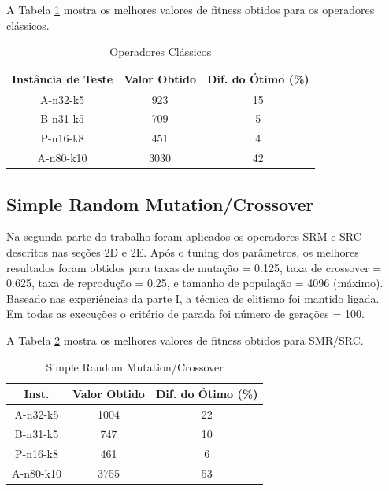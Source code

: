 \documentclass[conference]{IEEEtran}
\begin{document}
A Tabela \ref{table_classical_operators} mostra os melhores valores de fitness obtidos para os operadores clássicos.

\begin{table}[!t]
\renewcommand{\arraystretch}{1.3}
\centering
\caption{Operadores Clássicos}
\label{table_classical_operators}
\begin{tabular}{|c||c||c|}
\hline
Instância de Teste & Valor Obtido & Dif. do Ótimo (\%)\\
\hline
A-n32-k5 & 923 & 15\\   %
B-n31-k5 & 709 & 5\\    %
P-n16-k8 & 451 & 4\\    %
A-n80-k10 & 3030 & 42\\ %
\hline
\end{tabular}
\end{table}


\subsection{Simple Random Mutation/Crossover}
Na segunda parte do trabalho foram aplicados os operadores SRM e SRC descritos nas seções 2D e 2E. Após o tuning dos parâmetros, os melhores resultados foram obtidos para taxas de mutação = 0.125, taxa de crossover = 0.625, taxa de reprodução = 0.25, e tamanho de população = 4096 (máximo). Baseado nas experiências da parte I, a técnica de elitismo foi mantido ligada.\\
Em todas as execuções o critério de parada foi número de gerações = 100.



A Tabela \ref{table_srm} mostra os melhores valores de fitness obtidos para SMR/SRC.

\begin{table}[!t]
\renewcommand{\arraystretch}{1.3}
\centering
\caption{Simple Random Mutation/Crossover}
\label{table_srm}
\begin{tabular}{|c||c||c|}
\hline
Inst. & Valor Obtido & Dif. do Ótimo (\%)\\
\hline
A-n32-k5 & 1004 & 22\\  %
B-n31-k5 & 747 & 10\\   %
P-n16-k8 & 461 & 6\\    %
A-n80-k10 & 3755 & 53\\ %
\hline
\end{tabular}
\end{table}
\end{document}
